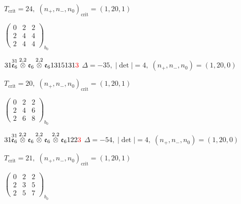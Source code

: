 \documentclass[10pt]{article}
\begin{document}
\hspace{1em}$T_{\text{crit}}=24,\; (n_+,n_-,n_0)_{\text{crit}}=(1,20,1)$

\hspace{2em}$\left(\begin{smallmatrix}0 & 2 & 2 \\ 2 & 4 & 4 \\ 2 & 4 & 4\end{smallmatrix}\right)_{\!b_0}$

\smallskip

$31\overset{31}{\mathfrak{e}_6}\overset{2,2}{\otimes}\mathfrak{e}_6\overset{2,2}{\otimes}\mathfrak{e}_61315131\textcolor{red}{3}$ \quad $\Delta=-35,\; |\det|=4,\; (n_+,n_-,n_0)=(1,20,0)$

\hspace{1em}$T_{\text{crit}}=20,\; (n_+,n_-,n_0)_{\text{crit}}=(1,20,1)$

\hspace{2em}$\left(\begin{smallmatrix}0 & 2 & 2 \\ 2 & 4 & 6 \\ 2 & 6 & 8\end{smallmatrix}\right)_{\!b_0}$

\smallskip

$31\overset{31}{\mathfrak{e}_6}\overset{2,2}{\otimes}\mathfrak{e}_6\overset{2,2}{\otimes}\mathfrak{e}_6\overset{2,2}{\otimes}\mathfrak{e}_6122\textcolor{red}{3}$ \quad $\Delta=-54,\; |\det|=4,\; (n_+,n_-,n_0)=(1,20,0)$

\hspace{1em}$T_{\text{crit}}=21,\; (n_+,n_-,n_0)_{\text{crit}}=(1,20,1)$

\hspace{2em}$\left(\begin{smallmatrix}0 & 2 & 2 \\ 2 & 3 & 5 \\ 2 & 5 & 7\end{smallmatrix}\right)_{\!b_0}$

\smallskip
\end{document}
